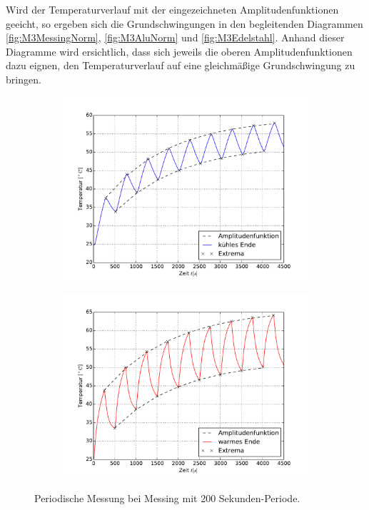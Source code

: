 Wird der Temperaturverlauf mit der eingezeichneten Amplitudenfunktionen geeicht, so ergeben sich die Grundschwingungen in den begleitenden Diagrammen \ref{fig:M3MessingNorm}, \ref{fig:M3AluNorm} und \ref{fig:M3Edelstahl}. 
Anhand dieser Diagramme wird ersichtlich, dass sich jeweils die oberen Amplitudenfunktionen dazu eignen, den Temperaturverlauf auf eine gleichmäßige Grundschwingung zu bringen.
\begin{figure}[h!]
	\centering
	\begin{subfigure}{0.9\textwidth}
	\includegraphics[width=\textwidth]{Bilder/M3_Messing_kuehl.pdf}
	\end{subfigure}
	\begin{subfigure}{0.9\textwidth}
	\includegraphics[width=\textwidth]{Bilder/M3_Messing_warm.pdf}
	\end{subfigure}
	\caption{Periodische Messung bei Messing mit 200 Sekunden-Periode.}
	\label{fig:M3Messing}
\end{figure}
